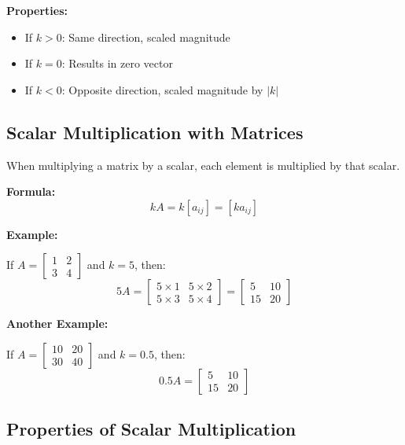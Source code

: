 \documentclass[11pt,a4paper]{article}
\begin{document}
\textbf{Properties:}
\begin{itemize}
    \item If $k > 0$: Same direction, scaled magnitude
    \item If $k = 0$: Results in zero vector
    \item If $k < 0$: Opposite direction, scaled magnitude by $|k|$
\end{itemize}

\subsection{Scalar Multiplication with Matrices}

When multiplying a matrix by a scalar, each element is multiplied by that scalar.

\textbf{Formula:}
\begin{equation}
    kA = k[a_{ij}] = [ka_{ij}]
\end{equation}

\textbf{Example:}

If $A = \begin{bmatrix} 1 & 2 \\ 3 & 4 \end{bmatrix}$ and $k = 5$, then:
\begin{equation}
    5A = \begin{bmatrix} 5 \times 1 & 5 \times 2 \\ 5 \times 3 & 5 \times 4 \end{bmatrix} = \begin{bmatrix} 5 & 10 \\ 15 & 20 \end{bmatrix}
\end{equation}

\textbf{Another Example:}

If $A = \begin{bmatrix} 10 & 20 \\ 30 & 40 \end{bmatrix}$ and $k = 0.5$, then:
\begin{equation}
    0.5A = \begin{bmatrix} 5 & 10 \\ 15 & 20 \end{bmatrix}
\end{equation}

\subsection{Properties of Scalar Multiplication}
\end{document}
